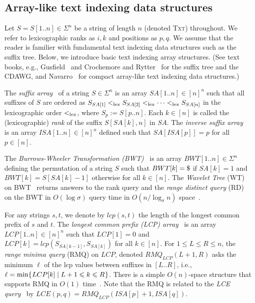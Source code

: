 \subsection{Array-like text indexing data structures}
\label{sec:prelim:ds:array}
Let $S = S[1..n] \in \Sigma^n$ be a string of length $n$ (denoted \textsc{Txt}) throughout.
We refer to lexicographic ranks as $i, k$ and positions as $p, q$.
We assume that the reader is familier with fundamental text indexing data structures such as the suffix tree. Below, we introduce basic text indexing array structures.  (See text books, e.g., Gusfield~\cite{gusfield1997book:stree} and Crochemore and Rytter~\cite{crochemore2002jewels} for the suffix tree and the CDAWG, and Navarro~\cite{navarro2016cds:book} for compact array-like text indexing data structures.) 

The \textit{suffix array}~\cite{manber:myers1993suffixarrays} of a string $S \in \Sigma^n$ is an array $SA[1..n] \in [n]^n$ such that all suffixes of $S$ are ordered as
$S_{SA[1]}<_{\mathrm{lex}} S_{SA[2]}<_{\mathrm{lex}} \dots <_{\mathrm{lex}} S_{SA[n]}$
in the lexicographic order $<_{\mathrm{lex}}$, where $S_{p} := S[p..n]$. Each $k \in [n]$ is called the (lexicographic) \textit{rank} of the suffix $S[SA[k], n]$ in $SA$. 
The \textit{inverse suffix array}~\cite{manber:myers1993suffixarrays} is an array $ISA[1..n] \in [n]^n$ defined such that $SA[ISA[p]] = p$ for all $p \in [n]$.

The \textit{Burrows-Wheeler Transformation (BWT)}~\cite{burrows:wheeler1994blocksorting} is an array $BWT[1..n] \in \Sigma^n$ defining the permutation of a string $S$ such that $BWT[k] = \daller$ if $SA[k] = 1$ and $BWT[k] = S[SA[k]-1]$ otherwise for all $k \in [n]$. 
The \textit{Wavelet Tree} (WT) on BWT~\cite{grossi2003high} returns answers to the rank query and the \textit{range distinct query} (RD) on the BWT in $O(\log\sigma)$ query time in $O(n/\log_\sigma n)$ space~\cite{grossi2003high}. 

For any strings $s, t$, we denote by $lcp(s, t)$ the length of the longest common prefix of $s$ and $t$. The \textit{longest common prefix (LCP) array}~\cite{manber:myers1993suffixarrays,kasai:lee2001lcp:linear} is an array $LCP[1..n] \in [n]^n$ such that $LCP[1] = 0$ and
$LCP[k] = lcp(S_{SA[k-1]}, S_{SA[k]})$
for all $k \in [n]$.
For $1\le L\le R\le n$, the \textit{range minima query} (RMQ) on $LCP$, denoted $RMQ_{LCP}(L+1, R)$ asks the minimum $\ell$ of the lcp values between suffixes in $[L..R]$, i.e., $\ell = \min \{\kern0.05em LCP[k] \mid L+1\leqslant k\leqslant R\kern0.05em\}$. There is a simple $O(n)$-space structure that supports RMQ in $O(1)$ time~\cite{bender:colton2000thelcaproblem}. 
Note that the RMQ is related to the \textit{LCE query}~\cite{navarro2016cds:book}
by $LCE(p, q) = RMQ_{LCP}(ISA[p]+1, ISA[q])$. 


